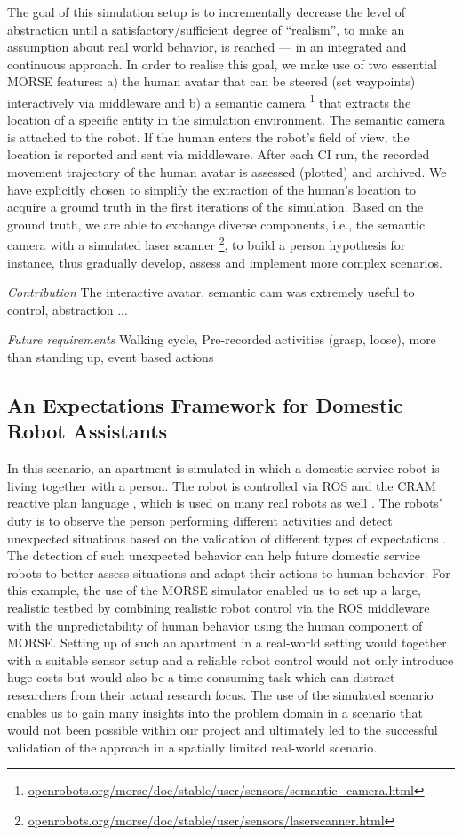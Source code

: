 \documentclass[conference]{IEEEtran}
\begin{document}
The goal of this simulation setup is to incrementally decrease the level of
abstraction until a satisfactory/sufficient degree of ``realism'', to make an
assumption about real world behavior, is reached --- in an integrated and
continuous approach. In order to realise this goal, we make use of two essential
MORSE features: a) the human avatar that can be steered (set waypoints)
interactively via middleware and b) a semantic camera
\footnote{\url{openrobots.org/morse/doc/stable/user/sensors/semantic_camera.html}}
that extracts the location of a specific entity in the simulation environment.
The semantic camera is attached to the robot. If the human enters the robot's
field of view, the location is reported and sent via middleware. After each CI
run, the recorded movement trajectory of the human avatar is assessed (plotted)
and archived. We have explicitly chosen to simplify the extraction of the
human's location to acquire a ground truth in the first iterations of the
simulation. Based on the ground truth, we are able to exchange diverse
components, i.e., the semantic camera with a simulated laser scanner
\footnote{\url{openrobots.org/morse/doc/stable/user/sensors/laserscanner.html}},
to build a person hypothesis for instance, thus gradually develop, assess and
implement more complex scenarios. 

\emph{Contribution} The interactive avatar, semantic cam was extremely useful to
control, abstraction ...

\emph{Future requirements} Walking cycle, Pre-recorded activities (grasp,
loose), more than standing up, event based actions

\subsection{An Expectations Framework for Domestic Robot Assistants}
\label{scenario2}

In this scenario, an apartment is simulated in which a domestic service robot is
living together with a person. The robot is controlled via ROS and the CRAM
reactive plan language \cite{beetz2010cram}, which is used on many real robots
as well \cite{pancakes11humanoids}. The robots' duty is to observe the person
performing different activities and detect unexpected situations based on the
validation of different types of expectations \cite{Karg2013}. The detection of
such unexpected behavior can help future domestic service robots to better
assess situations and adapt their actions to human behavior. For this example,
the use of the MORSE simulator enabled us to set up a large, realistic testbed
by combining realistic robot control via the ROS middleware with the
unpredictability of human behavior using the human component of MORSE. Setting
up of such an apartment in a real-world setting would together with a suitable
sensor setup and a reliable robot control would not only introduce huge costs
but would also be a time-consuming task which can distract researchers from
their actual research focus. The use of the simulated scenario enables us to
gain many insights into the problem domain in a scenario that would not been
possible within our project and ultimately led to the successful validation of
the approach in a spatially limited real-world scenario.
\end{document}

